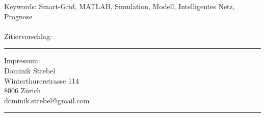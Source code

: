  \vspace*{13.5cm}
\begin{minipage}{80mm}
	Keywords: Smart-Grid, MATLAB, Simulation, Modell, Intelligentes Netz, Prognose
 \\
	\\
	Zitiervorschlag: 
	\vspace{1cm}


  \rule{80mm}{2pt}
  Impressum: \\
  Dominik Strebel \\
  Winterthurerstrasse 114 \\
  8006 Zürich\\
  dominik.strebel@gmail.com\\
  \rule{80mm}{2pt}
\end{minipage}
\newpage

